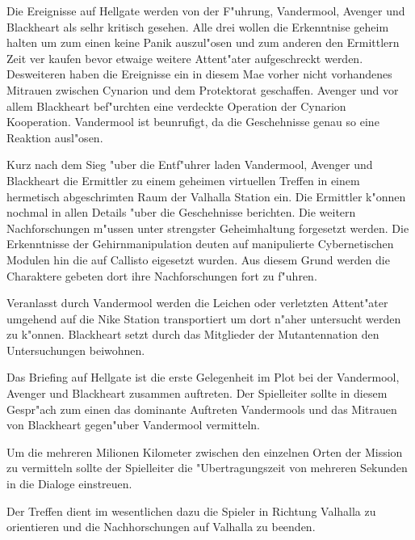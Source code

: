 
Die Ereignisse auf Hellgate werden von der F"uhrung, Vandermool, Avenger und Blackheart als selhr kritisch gesehen. Alle drei wollen die Erkenntnise geheim halten um zum einen keine Panik auszul"osen und zum anderen den Ermittlern Zeit ver kaufen bevor etwaige weitere Attent"ater aufgeschreckt werden. Desweiteren haben die Ereignisse ein in diesem Ma\3e vorher nicht vorhandenes Mi\3trauen zwischen Cynarion und dem Protektorat geschaffen. Avenger und vor allem Blackheart bef"urchten eine verdeckte Operation der Cynarion Kooperation. Vandermool ist beunrufigt, da\3 die Geschehnisse genau so eine Reaktion ausl"osen.

Kurz nach dem Sieg "uber die Entf"uhrer laden Vandermool, Avenger und Blackheart die Ermittler zu einem geheimen virtuellen Treffen in einem hermetisch abgeschrimten Raum der Valhalla Station ein. Die Ermittler k"onnen nochmal in allen Details "uber die Geschehnisse berichten. Die weitern Nachforschungen m"ussen unter strengster Geheimhaltung forgesetzt werden. Die Erkenntnisse der Gehirnmanipulation deuten auf manipulierte Cybernetischen Modulen hin die auf Callisto eigesetzt wurden. Aus diesem Grund werden die Charaktere gebeten dort ihre Nachforschungen fort zu f"uhren.

Veranlasst durch Vandermool werden die Leichen oder verletzten Attent"ater umgehend auf die Nike Station transportiert um dort n"aher untersucht werden zu k"onnen. Blackheart setzt durch das Mitglieder der Mutantennation den Untersuchungen beiwohnen.

\begin{remarks}
	Das Briefing auf Hellgate ist die erste Gelegenheit im Plot bei der Vandermool, Avenger und Blackheart zusammen auftreten. Der Spielleiter sollte in diesem Gespr"ach zum einen das dominante Auftreten Vandermools und das Mi\3trauen von Blackheart gegen"uber Vandermool vermitteln.

	Um die mehreren Milionen Kilometer zwischen den einzelnen Orten der Mission zu vermitteln sollte der Spielleiter die "Ubertragungszeit von mehreren Sekunden in die Dialoge einstreuen.

	Der Treffen dient im wesentlichen dazu die Spieler in Richtung Valhalla zu orientieren und die Nachhorschungen auf Valhalla zu beenden.
\end{remarks}


